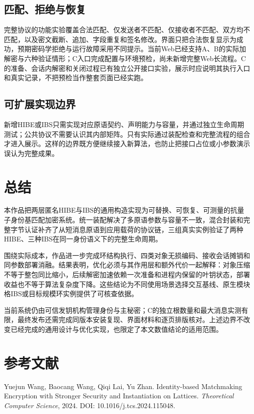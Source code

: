 \documentclass[UTF8,a4paper,12pt,oneside,openany,fontset=fandol]{ctexrep}
\begin{document}
\section{匹配、拒绝与恢复}
完整协议的功能实验覆盖合法匹配、仅发送者不匹配、仅接收者不匹配、双方均不匹配，以及密文截断、追加、字段重复和签名修改。界面只把合法恢复显示为成功，预期密码学拒绝与运行故障采用不同提示。当前Web已经支持A、B的实际加解密与六种验证情形；C入口完成配置与环境预检，尚未新增完整Web长流程。C的准备、会话内解密和关闭过程已有独立公开接口实验，展示时应说明其执行入口和真实记录，不把预检当作整套页面已经实跑。

\section{可扩展实现边界}
新增HIBE或IBS只需实现对应原语契约、声明能力与容量，并通过独立生命周期测试；公共协议不需要认识其内部矩阵。只有实际通过装配检查和完整流程的组合才进入展示。这样的边界既方便继续接入新算法，也防止把接口占位或小参数演示误认为完整成果。

\chapter{总结}
本作品把两层匿名HIBE与IBS的通用构造实现为可替换、可恢复、可测量的抗量子身份基匹配加密系统。统一装配解决了多原语参数与容量不一致，混合封装和完整字节认证补齐了从短消息原语到应用载荷的协议链，三组真实实例验证了两种HIBE、三种IBS在同一身份语义下的完整生命周期。

围绕实际成本，作品进一步完成环结构执行、四类对象无损编码、接收会话摊销和同参数部署消融。结果表明，优化必须与其作用层和额外代价一起解释：对象压缩不等于整包同比缩小，后续解密加速依赖一次准备和进程内保留的叶钥状态，部署收益也不等于算法复杂度下降。这些结论为不同使用场景选择交互基线、原生模块格IBS或目标规模环实例提供了可核查依据。

当前系统仍由可信发钥机构管理身份与主秘密；C的独立根数量和最大消息实测有限，最终发布还需完成同版本安装复现、界面材料和逐页排版核对。上述边界不改变已经完成的通用设计与优化实现，也限定了本文数值结论的适用范围。

\chapter*{参考文献}
\begingroup
\small
\setlength{\parskip}{4pt}
\noindent[1] Yuejun Wang, Baocang Wang, Qiqi Lai, Yu Zhan. Identity-based Matchmaking Encryption with Stronger Security and Instantiation on Lattices. \emph{Theoretical Computer Science}, 2024. DOI: 10.1016/j.tcs.2024.115048.\par
\end{document}

